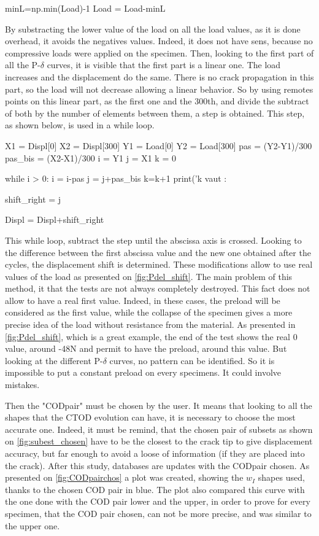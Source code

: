 \begin{customFrame}
minL=np.min(Load)-1
Load = Load-minL
\end{customFrame}
By substracting the lower value of the load on all the load values, as it is done overhead, it avoids the negatives values. Indeed, it does not have sens, because no compressive loads were applied on the specimen.
Then, looking to the first part of all the P-$\delta$ curves, it is visible that the first part is a linear one. The load increases and the displacement do the same. There is no crack propagation in this part, so the load will not decrease allowing a linear behavior. So by using remotes points on this linear part, as the first one and the 300th, and divide the subtract of both by the number of elements between them, a step is obtained. This step, as shown below, is used in a while loop.   
\begin{customFrame}
X1 = Displ[0]
X2 = Displ[300]
Y1 = Load[0]
Y2 = Load[300]
pas = (Y2-Y1)/300
pas_bis = (X2-X1)/300
i = Y1
j = X1
k = 0

while i > 0:
	i = i-pas
	j = j+pas_bis
	k=k+1
	print('k vaut : %

shift_right = j

Displ = Displ+shift_right	
\end{customFrame}
This while loop, subtract the step until the abscissa axis is crossed. Looking to the difference between the first abscissa value and the new one obtained after the cycles, the displacement shift is determined. These modifications allow to use real values of the load as presented on \ref{fig:Pdel_shift}. The main problem of this method, it that the tests are not always completely destroyed. This fact does not allow to have a real first value. Indeed, in these cases, the preload will be considered as the first value, while the collapse of the specimen gives a more precise idea of the load without resistance from the material. As presented in \ref{fig:Pdel_shift}, which is a great example, the end of the test shows the real 0 value, around -48\si{\newton} and permit to have the preload, around this value. But looking at the different P-$\delta$ curves, no pattern can be identified. So it is impossible to put a constant preload on every specimens. It could involve mistakes.
 
Then the "CODpair" must be chosen by the user. It means that looking to all the shapes that the CTOD evolution can have, it is necessary to choose the most accurate one. Indeed, it must be remind, that the chosen pair of subsets as shown on \ref{fig:subest_chosen} have to be the closest to the crack tip to give displacement accuracy, but far enough to avoid a loose of information (if they are placed into the crack). After this study, databases are updates with the CODpair chosen. As presented on \ref{fig:CODpairchos} a plot was created, showing the $w_{I}$ shapes used, thanks to the chosen COD pair in blue. The plot also compared this curve with the one done with the COD pair lower and the upper, in order to prove for every specimen, that the COD pair chosen, can not be more precise, and was similar to the upper one. 

